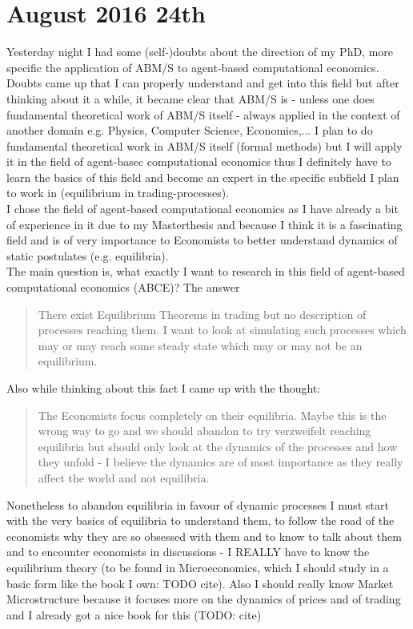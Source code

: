 \section*{August 2016 24th}
Yesterday night I had some (self-)doubts about the direction of my PhD, more specific the application of ABM/S to agent-based computational economics. \\
Doubts came up that I can properly understand and get into this field but after thinking about it a while, it became clear that ABM/S is - unless one does fundamental theoretical work of ABM/S itself - always applied in the context of another domain e.g. Physics, Computer Science, Economics,... I plan to do fundamental theoretical work in ABM/S itself (formal methods) but I will apply it in the field of agent-basec computational economics thus I definitely have to learn the basics of this field and become an expert in the specific subfield I plan to work in (equilibrium in trading-processes). \\
I chose the field of agent-based computational economics as I have already a bit of experience in it due to my Masterthesis and because I think it is a fascinating field and is of very importance to Economists to better understand dynamics of static postulates (e.g. equilibria). \\
The main question is, what exactly I want to research in this field of agent-based computational economics (ABCE)? The answer 

\begin{quote}
There exist Equilibrium Theorems in trading but no description of processes reaching them. I want to look at simulating such processes which may or may reach some steady state which may or may not be an equilibrium.
\end{quote}

Also while thinking about this fact I came up with the thought: 

\begin{quote}
The Economists focus completely on their equilibria. Maybe this is the wrong way to go and we should abandon to try verzweifelt reaching equilibria but should only look at the dynamics of the processes and how they unfold - I believe the dynamics are of most importance as they really affect the world and not equilibria.
\end{quote}

Nonetheless to abandon equilibria in favour of dynamic processes I must start with the very basics of equilibria to understand them, to follow the road of the economists why they are so obsessed with them and to know to talk about them and to encounter economists in discussions - I REALLY have to know the equilibrium theory (to be found in Microeconomics, which I should study in a basic form like the book I own: TODO cite). Also I should really know Market Microstructure because it focuses more on the dynamics of prices and of trading and I already got a nice book for this (TODO: cite) \bigskip

